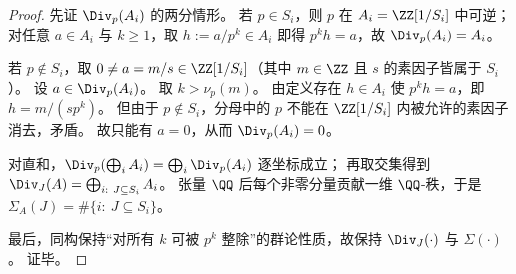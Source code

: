 \begin{proof}
先证 \(\Div_p(A_i)\) 的两分情形。
若 \(p\in S_i\)，则 \(p\) 在 \(A_i=\ZZ[1/S_i]\) 中可逆；对任意 \(a\in A_i\) 与 \(k\ge 1\)，取 \(h:=a/p^k\in A_i\) 即得 \(p^k h=a\)，故 \(\Div_p(A_i)=A_i\)。
\par
若 \(p\notin S_i\)，取 \(0\neq a=m/s\in \ZZ[1/S_i]\)（其中 \(m\in\ZZ\) 且 \(s\) 的素因子皆属于 \(S_i\)）。
设 \(a\in\Div_p(A_i)\)。
取 \(k>\nu_p(m)\)。
由定义存在 \(h\in A_i\) 使 \(p^k h=a\)，即 \(h=m/(sp^k)\)。
但由于 \(p\notin S_i\)，分母中的 \(p\) 不能在 \(\ZZ[1/S_i]\) 内被允许的素因子消去，矛盾。
故只能有 \(a=0\)，从而 \(\Div_p(A_i)=0\)。
\par
对直和，\(\Div_p(\bigoplus_i A_i)=\bigoplus_i\Div_p(A_i)\) 逐坐标成立；
再取交集得到 \(\Div_J(A)=\bigoplus_{i:\ J\subseteq S_i}A_i\)。
张量 \(\QQ\) 后每个非零分量贡献一维 \(\QQ\)-秩，于是
\(\Sigma_A(J)=\#\{i:\ J\subseteq S_i\}\)。
\par
最后，同构保持“对所有 \(k\) 可被 \(p^k\) 整除”的群论性质，故保持 \(\Div_J(\cdot)\) 与 \(\Sigma(\cdot)\)。
证毕。
\end{proof}

\endinput
